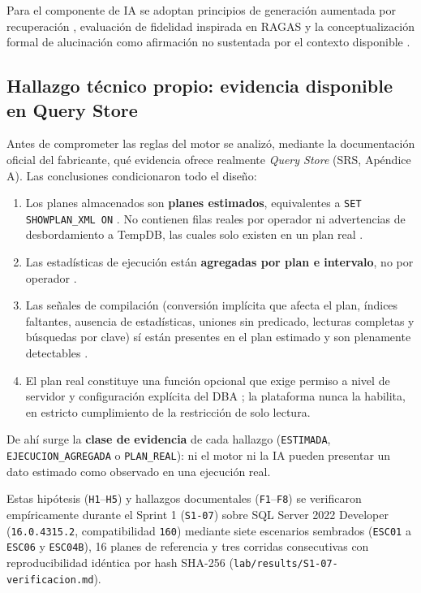 \documentclass[12pt,a4paper]{article}
\begin{document}
Para el componente de IA se adoptan principios de generación aumentada por recuperación \cite{lewis-rag}, evaluación de fidelidad inspirada en RAGAS \cite{es-ragas} y la conceptualización formal de alucinación como afirmación no sustentada por el contexto disponible \cite{ji-hallucination}.

\subsection{Hallazgo técnico propio: evidencia disponible en Query Store}

Antes de comprometer las reglas del motor se analizó, mediante la documentación oficial del fabricante, qué evidencia ofrece realmente \textit{Query Store} (SRS, Apéndice A). Las conclusiones condicionaron todo el diseño:

\begin{enumerate}[leftmargin=1.5em]
    \item Los planes almacenados son \textbf{planes estimados}, equivalentes a \texttt{SET SHOWPLAN\_XML ON} \cite{ms-qs-collect,ms-qs-plan,ms-ss2022,ms-qs-manage}. No contienen filas reales por operador ni advertencias de desbordamiento a TempDB, las cuales solo existen en un plan real \cite{ms-plans,ms-tempdb}.
    \item Las estadísticas de ejecución están \textbf{agregadas por plan e intervalo}, no por operador \cite{ms-qs-stats}.
    \item Las señales de compilación (conversión implícita que afecta el plan, índices faltantes, ausencia de estadísticas, uniones sin predicado, lecturas completas y búsquedas por clave) sí están presentes en el plan estimado y son plenamente detectables \cite{redgate-warnings}.
    \item El plan real constituye una función opcional que exige permiso a nivel de servidor y configuración explícita del DBA \cite{ms-plan-stats}; la plataforma nunca la habilita, en estricto cumplimiento de la restricción de solo lectura.
\end{enumerate}

De ahí surge la \textbf{clase de evidencia} de cada hallazgo (\texttt{ESTIMADA}, \texttt{EJECUCION\_AGREGADA} o \texttt{PLAN\_REAL}): ni el motor ni la IA pueden presentar un dato estimado como observado en una ejecución real.

Estas hipótesis (\texttt{H1}--\texttt{H5}) y hallazgos documentales (\texttt{F1}--\texttt{F8}) se verificaron empíricamente durante el Sprint 1 (\texttt{S1-07}) sobre SQL Server 2022 Developer (\texttt{16.0.4315.2}, compatibilidad \texttt{160}) mediante siete escenarios sembrados (\texttt{ESC01} a \texttt{ESC06} y \texttt{ESC04B}), 16 planes de referencia y tres corridas consecutivas con reproducibilidad idéntica por hash SHA-256 (\texttt{lab/results/S1-07-verificacion.md}).
\end{document}
